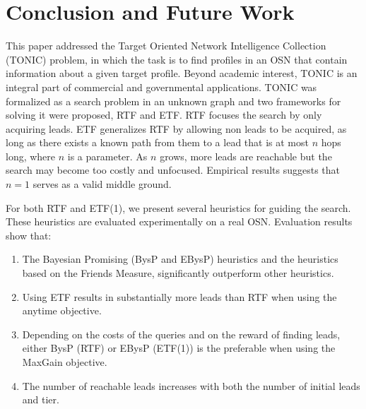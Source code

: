 \documentclass[journal]{IEEEtran}
\begin{document}
\section{Conclusion and Future Work}
\label{sec:conclusions}


This paper addressed the Target Oriented Network Intelligence Collection (TONIC) problem, in which the task is to find profiles in an OSN that contain information about a given target profile. Beyond academic interest, TONIC is an integral part of commercial and governmental applications.
TONIC was formalized as a search problem in an unknown graph and two frameworks for solving it were proposed, RTF and ETF. RTF focuses the search by only acquiring leads. ETF generalizes RTF by allowing non leads to be acquired, as long as there exists a known path from them to a lead that is at most $n$ hops long, where $n$ is a parameter. As $n$ grows, more leads are reachable but the search may become too costly and unfocused. Empirical results suggests that $n=1$ serves as a valid middle ground.

For both RTF and ETF(1), we present several heuristics for guiding the search. These heuristics are evaluated experimentally on a real OSN. 
Evaluation results show that:

\begin{enumerate}
\item The Bayesian Promising (BysP and EBysP) heuristics and the heuristics based on the Friends Measure, significantly outperform other heuristics.
\item Using ETF results in substantially more leads than RTF when using the anytime objective. 
\item Depending on the costs of the queries and on the reward of finding leads, either BysP (RTF) or EBysP (ETF(1)) is the preferable when using the MaxGain objective.
\item The number of reachable leads increases with both the number of initial leads and tier. 
\end{enumerate}

\end{document}
